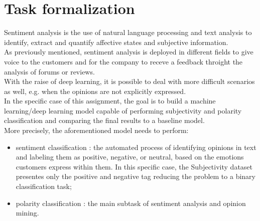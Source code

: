 \section{Task formalization}
Sentiment analysis is the use of natural language processing and text analysis to identify, extract and quantify affective states and subjective information.\\
As previously mentioned, sentiment analysis is deployed in different fields to give voice to the customers and for the company to receve a feedback throight the analysis of forums or reviews.\\
With the raise of deep learning, it is possible to deal with more difficult scenarios as well, e.g. when the opinions are not explicitly expressed.\\
In the specific case of this assignment, the goal is to build a machine learning/deep learning model capable of performing subjectivity and polarity classification and comparing the final results to a baseline model.\\
More precisely, the aforementioned model needs to perform:
\begin{itemize}
    \item sentiment classification : the automated process of identifying opinions in text and labeling them as positive, negative, or neutral, based on the emotions customers express within them. In this specific case, the Subjectivity dataset presentes only the positive and negative tag reducing the problem to a binary classification task;
    \item polarity classification : the main subtask of sentiment analysis and opinion mining.
\end{itemize}

